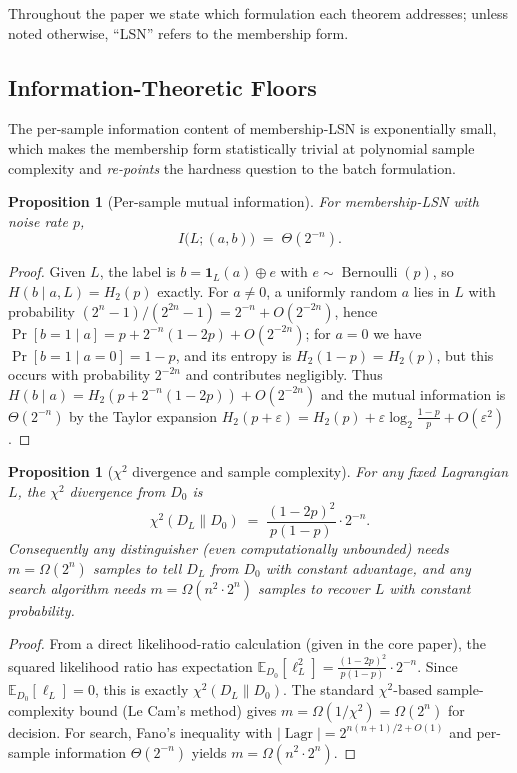 \documentclass[11pt,a4paper]{article}
\theoremstyle{plain}
\newtheorem{proposition}[theorem]{Proposition}
\theoremstyle{definition}
\newcommand{\E}{\mathbb{E}}
\DeclareMathOperator{\Lagr}{Lagr}
\begin{document}
Throughout the paper we state which formulation each theorem addresses; unless noted otherwise, ``LSN'' refers to the membership form.

\subsection{Information-Theoretic Floors}
\label{sec:info-floors}

The per-sample information content of membership-LSN is exponentially small, which makes the membership form statistically trivial at polynomial sample complexity and \emph{re-points} the hardness question to the batch formulation.

\begin{proposition}[Per-sample mutual information]
\label{prop:per-sample-mi}
For membership-LSN with noise rate $p$,
\[
I\bigl(L; (a,b)\bigr) \;=\; \Theta(2^{-n}).
\]
\end{proposition}

\begin{proof}
Given $L$, the label is $b = \mathbf{1}_L(a) \oplus e$ with $e \sim \operatorname{Bernoulli}(p)$, so $H(b \mid a, L) = H_2(p)$ exactly.  For $a \neq 0$, a uniformly random $a$ lies in $L$ with probability $(2^n-1)/(2^{2n}-1) = 2^{-n} + O(2^{-2n})$, hence $\Pr[b=1 \mid a] = p + 2^{-n}(1-2p) + O(2^{-2n})$; for $a=0$ we have $\Pr[b=1 \mid a=0] = 1-p$, and its entropy is $H_2(1-p) = H_2(p)$, but this occurs with probability $2^{-2n}$ and contributes negligibly.  Thus $H(b \mid a) = H_2(p + 2^{-n}(1-2p)) + O(2^{-2n})$ and the mutual information is $\Theta(2^{-n})$ by the Taylor expansion $H_2(p+\varepsilon) = H_2(p) + \varepsilon\log_2\frac{1-p}{p} + O(\varepsilon^2)$.
\end{proof}

\begin{proposition}[$\chi^2$ divergence and sample complexity]
\label{prop:chi2-sample}
For any fixed Lagrangian $L$, the $\chi^2$ divergence from $D_0$ is
\[
\chi^2(D_L \| D_0) \;=\; \frac{(1-2p)^2}{p(1-p)} \cdot 2^{-n}.
\]
Consequently any distinguisher (even computationally unbounded) needs $m = \Omega(2^n)$ samples to tell $D_L$ from $D_0$ with constant advantage, and any search algorithm needs $m = \Omega(n^2 \cdot 2^n)$ samples to recover $L$ with constant probability.
\end{proposition}

\begin{proof}
From a direct likelihood-ratio calculation (given in the core paper), the squared likelihood ratio has expectation $\E_{D_0}[\ell_L^2] = \frac{(1-2p)^2}{p(1-p)} \cdot 2^{-n}$.  Since $\E_{D_0}[\ell_L]=0$, this is exactly $\chi^2(D_L \| D_0)$.  The standard $\chi^2$-based sample-complexity bound (Le Cam's method) gives $m = \Omega(1/\chi^2) = \Omega(2^n)$ for decision.  For search, Fano's inequality with $|\Lagr| = 2^{n(n+1)/2+O(1)}$ and per-sample information $\Theta(2^{-n})$ yields $m = \Omega(n^2 \cdot 2^n)$.
\end{proof}
\end{document}
